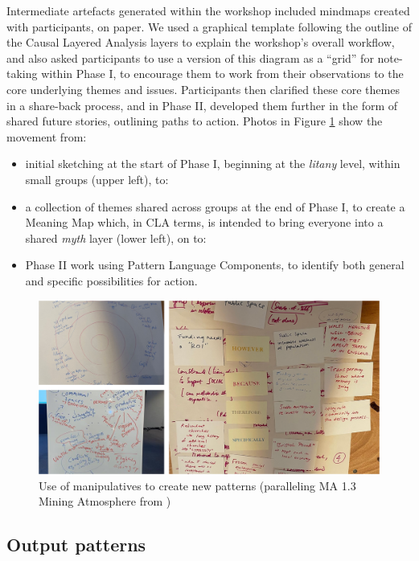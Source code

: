 \documentclass[acmlarge,timestamp]{acmart}
\DeclareRobustCommand{\scitshape}{\fontshape{\scitdefault}\selectfont}
\begin{document}
Intermediate artefacts generated within the workshop included mindmaps
created with participants, on paper.  We used a graphical template
following the outline of the Causal Layered Analysis layers to explain
the workshop’s overall workflow, and also asked participants to use a
version of this diagram as a “grid” for note-taking within Phase I, to
encourage them to work from their observations to the core underlying
themes and issues.  Participants then clarified these core themes in a
share-back process, and in Phase II, developed them further in the
form of shared future stories, outlining paths to action.  Photos in
Figure \ref{ExampleParticipantPattern} show the movement from:
\begin{itemize}
  \item initial sketching at the start of Phase I, beginning at the
    \emph{litany} level, within small groups (upper left), to:
  \item a collection of themes shared across groups at the end of
    Phase I, to create a {\sc Meaning Map} which, in CLA terms, is
    intended to bring everyone into a shared \emph{myth} layer (lower
    left), on to:
  \item Phase II work using {\sc Pattern Language Components},
    to identify both general and specific possibilities for action.
\end{itemize}

\begin{figure}
  \includegraphics[width=\textwidth]{PatternProcess.png}
  \caption{Use of manipulatives to create new patterns (paralleling {\scitshape MA 1.3 Mining Atmosphere} from \citet{iba2016pattern}) \label{ExampleParticipantPattern}}
\end{figure}

\clearpage 

\subsection{Output patterns} ~
\smallskip
\end{document}
